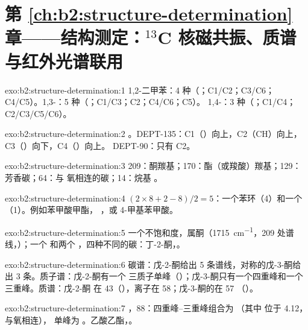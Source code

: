 \section*{第 \ref{ch:b2:structure-determination} 章——结构测定：\texorpdfstring{$^{13}$C}{13C} 核磁共振、质谱与红外光谱联用}

\begin{solution}{exo:b2:structure-determination:1}
1,2-二甲苯：4 种（；C1/C2；C3/C6；C4/C5）。1,3-：5 种（；C1/C3；C2；C4/C6；C5）。
1,4-：3 种（；C1/C4；C2/C3/C5/C6）。
\end{solution}

\begin{solution}{exo:b2:structure-determination:2}
。DEPT-135：C1（）向上，C2（CH）向上，C3（）向下，C4（）向上。
DEPT-90：只有 C2。
\end{solution}

\begin{solution}{exo:b2:structure-determination:3}
209：酮羰基；170：酯（或羧酸）羰基；129：芳香碳；64：与
氧相连的碳；14：烷基 。
\end{solution}

\begin{solution}{exo:b2:structure-determination:4}
$(2 \times 8 + 2 - 8)/2 = 5$：一个苯环（4）和一个 （1）。例如苯甲酸甲酯，
，或 4-甲基苯甲酸。
\end{solution}

\begin{solution}{exo:b2:structure-determination:5}
一个不饱和度，属酮（\qty{1715}{cm^{-1}}，209 处谱线，）；一个  和两个
，四种不同的碳：丁-2-酮，。
\end{solution}

\begin{solution}{exo:b2:structure-determination:6}
碳谱：戊-2-酮给出 5 条谱线，对称的戊-3-酮给出 3 条。质子谱：戊-2-酮有一个
三质子单峰（）；戊-3-酮只有一个四重峰和一个三重峰。质谱：戊-2-酮
在 43（），离子在 58；戊-3-酮的在 57
（）。
\end{solution}

\begin{solution}{exo:b2:structure-determination:7}
，88：四重峰–三重峰组合为 （其中  位于 4.12，与氧相连），
单峰为 。乙酸乙酯，。
\end{solution}

